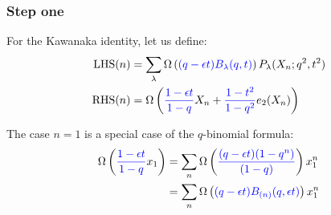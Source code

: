 \documentclass[12pt,dvips]{amsart}
\begin{document}
\subsubsection{Step one}
\noindent
For the Kawanaka identity, let us define:
\begin{align*}
\text{LHS}(n) & =  \sum_{ \lambda} \Omega \left ( {\color{blue}(q - \epsilon t) B_\lambda(q,t)}\right ) P_\lambda(X_n;q^2,t^2) \\
\text{RHS}(n) & =  \Omega \left ( {\color{blue}\frac{1-\epsilon t}{1-q}} X_n + {\color{blue}\frac{1-t^2}{1-q^2}} e_2(X_n) \right ) 
\end{align*}
	



\medskip
\noindent
The case $n=1$ is a special case of the $q$-binomial formula:
\begin{align*}
\Omega \left ( {\color{blue}\frac{1-\epsilon t}{1 - q}}x_1\right ) 
&= \sum_n \Omega \left ( {\color{blue}\frac{(q-\epsilon t)(1-q^n)}{(1-q)}}\right ) x_1^n \\
&= \sum_n \Omega \left ( {\color{blue}(q-\epsilon t) B_{(n)}(q, \epsilon t)} \right ) x_1^n
\end{align*}

\end{document}

